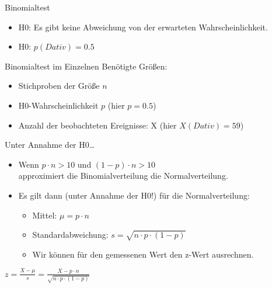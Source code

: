 \begin{frame}
  {Binomialtest}
  \begin{itemize}[<+->]
    \item H0: Es gibt keine Abweichung von der erwarteten Wahrscheinlichkeit.
      \Zeile
    \item \alert{H0: $p(Dativ)=0.5$}
  \end{itemize}
\end{frame}

\begin{frame}
  {Binomialtest im Einzelnen}
  Benötigte Größen:

  \begin{itemize}[<+->]
    \item Stichproben der Größe \alert{$n$}
    \item H0-Wahrscheinlichkeit \alert{$p$} (hier $p=0.5$)
    \item Anzahl der beobachteten Ereignisse: \alert{X} (hier $X(Dativ)=59$)
  \end{itemize}
\end{frame}

\begin{frame}
  {Unter Annahme der H0\ldots}
  \begin{itemize}[<+->]
    \item Wenn \alert{$p\cdot n>10$ und $(1-p)\cdot n>10$}\\
      approximiert die Binomialverteilung die Normalverteilung.
      \Zeile
    \item Es gilt dann (unter Annahme der H0!) für die Normalverteilung:
      \Zeile
      \begin{itemize}
	\item Mittel: \alert{$\mu=p\cdot n$}
	\item Standardabweichung: \alert{$s=\sqrt{n\cdot p\cdot(1-p)}$}
	\item Wir können für den gemessenen Wert den z-Wert ausrechnen.
      \end{itemize}
  \end{itemize}
  \pause
  \vspace{0.5cm}
  \begin{center}
    \alert{$z=\frac{X-\mu}{s}=\frac{X-p\cdot n}{\sqrt{n\cdot p\cdot (1-p)}}$}
  \end{center}
\end{frame}

